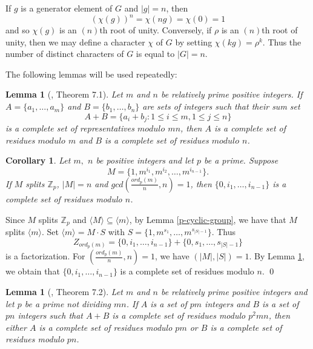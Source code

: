 \documentclass[preprint]{elsarticle}
\newtheorem{lem}[thm]{Lemma}
\newtheorem{cor}[thm]{Corollary}
\begin{document}
If $g$ is a generator element of $G$ and $|g|= n$, then $$(\chi(g))^n = \chi(ng) = \chi(0) = 1$$ and so $\chi(g)$ is an $(n)$th root of unity.
Conversely, if $\rho$ is an $(n)$th root of unity, then we may define a character $\chi$ of $G$ by setting $\chi(kg) = \rho ^k$.
Thus the number of distinct characters of $G$ is equal to $|G| = n$.


The following lemmas will be used repeatedly:







\begin{lem}[\cite{[SS]}, Theorem 7.1] \label{prime-factor}
Let $m$ and $n$ be relatively prime positive integers.
If $A=\{a_1,\ldots ,a_m\}$ and $B=\{b_1,\ldots ,b_n\}$ are sets of integers such that their sum set
$$A+B=\{a_i+b_j:1\leq i\leq m, 1\leq j\leq n\}$$
is a complete set of representatives $modulo$ $mn$,
then $A$ is a complete set of residues $modulo$ $m$ and $B$ is a complete set of residues $modulo$ $n$.
\end{lem}

\begin{cor} \label{cor-factor-integers}
Let $m,$ $n$ be positive integers and let $p$ be a prime.
Suppose $$M=\{1,m^{i_1},m^{i_2},\ldots ,m^{i_{n-1}}\}.$$
If $M$ splits $\mathbb{Z}_p$, $|M|=n$ and $gcd(\frac{ord_p(m)}{n},n)=1$,
then $\{0,i_1,\ldots ,i_{n-1}\}$ is a complete set of residues modulo $n$.
\end{cor}

\pf
Since $M$ splits $\mathbb{Z}_p$ and $\langle M\rangle\subseteq\langle m\rangle$, by Lemma \ref{p-cyclic-group},
we have that $M$ splits $\langle m\rangle$.
Set $\langle m\rangle=M\cdot S$ with $S=\{1,m^{s_1},\ldots,m^{s_{|S|-1}}\}$.
Thus $$Z_{ord_p(m)}=\{0,i_1,\ldots ,i_{n-1}\}+\{0,s_1,\ldots ,s_{|S|-1}\}$$
is a factorization.
For $(\frac{ord_p(m)}{n},n)=1$, we have $(|M|,|S|)=1$.
By Lemma \ref{prime-factor}, we obtain that $\{0,i_1,\ldots ,i_{n-1}\}$ is a complete set of residues modulo $n$.
\qed

\begin{lem}[\cite{[SS]}, Theorem 7.2] \label{prime-factor-2}
Let $m$ and $n$ be relatively prime positive integers and let $p$ be a prime not dividing $mn$.
If $A$ is a set of $pm$ integers and $B$ is a set of $pn$ integers such that $A+B$ is a complete set of residues modulo $p^2mn$, then either $A$ is a complete set of residues modulo $pm$ or $B$ is a complete set of residues modulo $pn$.
\end{lem}
\end{document}
